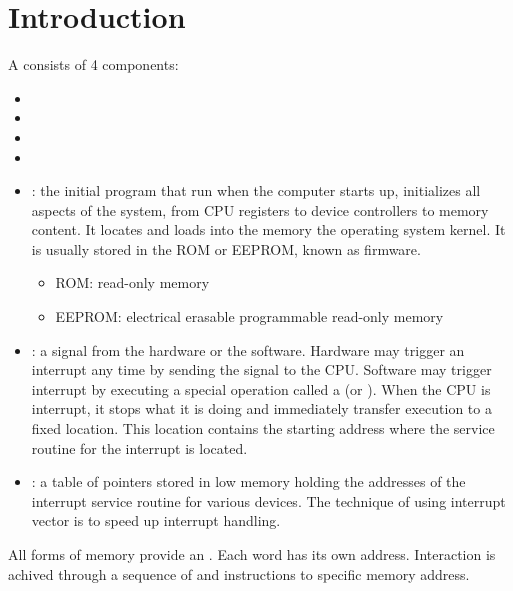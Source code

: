 \chapter{Introduction}


    \par A  consists of 4 components:

    \begin{itemize}
      \item {}
      \item {}
      \item {}
      \item {}
    \end{itemize}


    \begin{itemize}
      \item {}: the initial program that run when the computer
        starts up, initializes all aspects of the system, from CPU registers to
          device controllers to memory content. It locates and loads into the
          memory the operating system kernel. It is usually stored in the ROM
          or EEPROM, known as firmware.
        \begin{itemize}
          \item ROM: read-only memory
          \item EEPROM: electrical erasable programmable read-only memory
        \end{itemize}
      \item {}: a signal from the hardware or the software.
        Hardware may trigger an interrupt any time by sending the signal to the
        CPU. Software may trigger interrupt by executing a special operation
        called a  (or ). When the CPU is
        interrupt, it stops what it is doing and immediately transfer execution
        to a fixed location. This location contains the starting address where
        the service routine for the interrupt is located.
      \item {}: a table of pointers stored in low memory
        holding the addresses of the interrupt service routine for various
        devices. The technique of using interrupt vector is to speed up
        interrupt handling.
    \end{itemize}

    \par All forms of memory provide an . Each word has its
      own address. Interaction is achived through a sequence of  and
       instructions to specific memory address.
